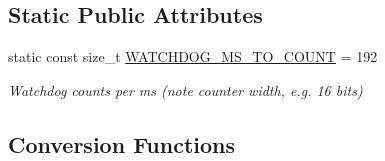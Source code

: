 \subsection*{Static Public Attributes}
\begin{DoxyCompactItemize}
\item 
static const size\+\_\+t \hyperlink{classsaw_robot_i_o1394_1_1osa_robot1394_a3d4cfdd12c7987826fb43028bd06e4b5}{W\+A\+T\+C\+H\+D\+O\+G\+\_\+\+M\+S\+\_\+\+T\+O\+\_\+\+C\+O\+U\+N\+T} = 192
\begin{DoxyCompactList}\small\item\em Watchdog counts per ms (note counter width, e.\+g. 16 bits) \end{DoxyCompactList}\end{DoxyCompactItemize}
\subsection*{Conversion Functions}
\label{_amgrpf75c7e767a0acc58e1bb77c3595a5698}%
